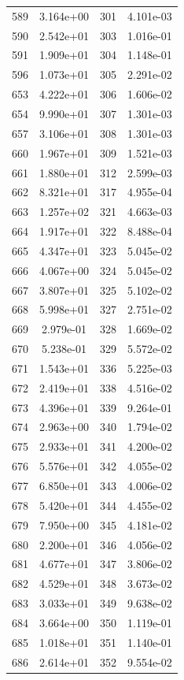 \documentclass[12pt]{article}
\begin{document}
\begin{longtable}{@{}cccc@{}}
589 & 3.164e+00 & 301 & 4.101e-03 \\
590 & 2.542e+01 & 303 & 1.016e-01 \\
591 & 1.909e+01 & 304 & 1.148e-01 \\
596 & 1.073e+01 & 305 & 2.291e-02 \\
653 & 4.222e+01 & 306 & 1.606e-02 \\
654 & 9.990e+01 & 307 & 1.301e-03 \\
657 & 3.106e+01 & 308 & 1.301e-03 \\
660 & 1.967e+01 & 309 & 1.521e-03 \\
661 & 1.880e+01 & 312 & 2.599e-03 \\
662 & 8.321e+01 & 317 & 4.955e-04 \\
663 & 1.257e+02 & 321 & 4.663e-03 \\
664 & 1.917e+01 & 322 & 8.488e-04 \\
665 & 4.347e+01 & 323 & 5.045e-02 \\
666 & 4.067e+00 & 324 & 5.045e-02 \\
667 & 3.807e+01 & 325 & 5.102e-02 \\
668 & 5.998e+01 & 327 & 2.751e-02 \\
669 & 2.979e-01 & 328 & 1.669e-02 \\
670 & 5.238e-01 & 329 & 5.572e-02 \\
671 & 1.543e+01 & 336 & 5.225e-03 \\
672 & 2.419e+01 & 338 & 4.516e-02 \\
673 & 4.396e+01 & 339 & 9.264e-01 \\
674 & 2.963e+00 & 340 & 1.794e-02 \\
675 & 2.933e+01 & 341 & 4.200e-02 \\
676 & 5.576e+01 & 342 & 4.055e-02 \\
677 & 6.850e+01 & 343 & 4.006e-02 \\
678 & 5.420e+01 & 344 & 4.455e-02 \\
679 & 7.950e+00 & 345 & 4.181e-02 \\
680 & 2.200e+01 & 346 & 4.056e-02 \\
681 & 4.677e+01 & 347 & 3.806e-02 \\
682 & 4.529e+01 & 348 & 3.673e-02 \\
683 & 3.033e+01 & 349 & 9.638e-02 \\
684 & 3.664e+00 & 350 & 1.119e-01 \\
685 & 1.018e+01 & 351 & 1.140e-01 \\
686 & 2.614e+01 & 352 & 9.554e-02 \\

\end{longtable}
\end{document}
